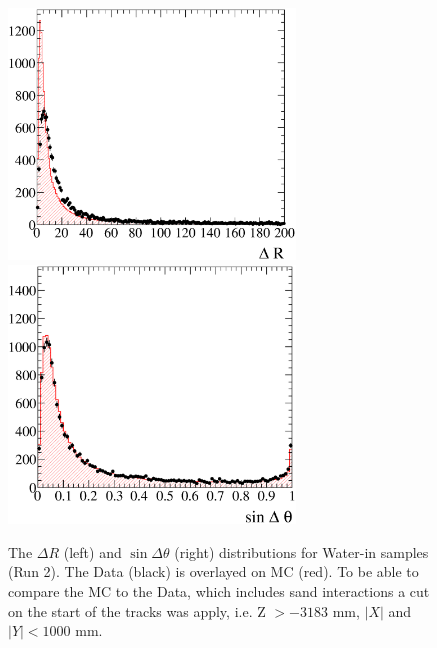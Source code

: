 \begin{figure}
\centering
\includegraphics[width=3in]{Figures/optCut-5FE-Run2water-dR-DoMC.eps}
\includegraphics[width=3in]{Figures/optCut-5FE-Run2water-sinT-DoMC.eps}
\caption{The $\Delta R$ (left) and $\sin\Delta\theta$ (right) 
distributions for Water-in samples (Run 2). 
The Data (black) is overlayed on MC (red). 
To be able to compare the MC to the Data, which includes sand interactions 
a cut on the start of the tracks was apply, i.e. Z $> -3183$ mm, 
$|X|$ and $|Y| < 1000$ mm.}
\label{fig:dRsindTWaterIn}
\end{figure}

